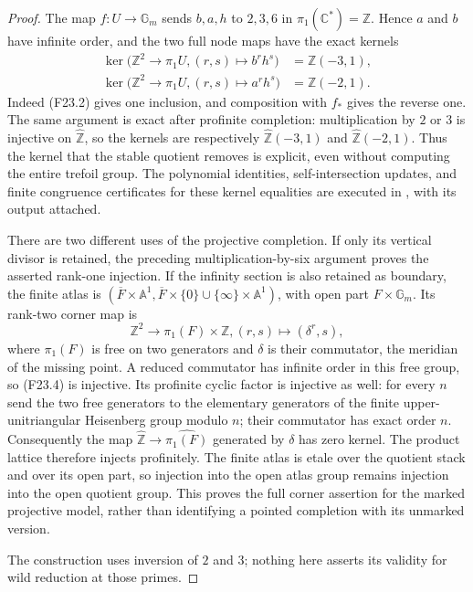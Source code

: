 \begin{proof}
The map $f:U\to\mathbb G_m$ sends $b,a,h$ to $2,3,6$ in
$\pi_1(\mathbb C^*)=\mathbb Z$. Hence $a$ and $b$ have infinite
order, and the two full node maps have the exact kernels
\[
 \begin{split}
 \ker\bigl(\mathbb Z^2\longrightarrow\pi_1U,
                      (r,s)\longmapsto b^r h^s\bigr)
       &=\mathbb Z(-3,1),\\
 \ker\bigl(\mathbb Z^2\longrightarrow\pi_1U,
                      (r,s)\longmapsto a^r h^s\bigr)
       &=\mathbb Z(-2,1).
 \end{split}                                             \tag{F23.3}
\]
Indeed (F23.2) gives one inclusion, and composition with $f_*$
gives the reverse one. The same argument is exact after profinite
completion: multiplication by $2$ or $3$ is injective on
$\widehat{\mathbb Z}$, so the kernels are respectively
$\widehat{\mathbb Z}(-3,1)$ and
$\widehat{\mathbb Z}(-2,1)$. Thus the kernel that the stable
quotient removes is explicit, even without computing the entire
trefoil group. The polynomial identities, self-intersection updates,
and finite congruence certificates for these kernel equalities are
executed in , with its output
attached.

There are two different uses of the projective completion.
If only its vertical divisor is retained, the preceding
multiplication-by-six argument proves the asserted rank-one
injection. If the infinity section is also retained as boundary,
the finite atlas is
$(\overline F\times\mathbb A^1,
  \overline F\times\{0\}\cup\{\infty\}\times\mathbb A^1)$,
with open part $F\times\mathbb G_m$. Its rank-two corner map is
\[
 \mathbb Z^2\longrightarrow \pi_1(F)\times\mathbb Z,
                  (r,s)\longmapsto (\delta^r,s),           \tag{F23.4}
\]
where $\pi_1(F)$ is free on two generators and $\delta$ is their
commutator, the meridian of the missing point. A reduced commutator
has infinite order in this free group, so (F23.4) is injective.
Its profinite cyclic factor is injective as well: for every $n$
send the two free generators to the elementary generators of the
finite upper-unitriangular Heisenberg group modulo $n$; their
commutator has exact order $n$. Consequently the map
$\widehat{\mathbb Z}\to\widehat{\pi_1(F)}$ generated by $\delta$
has zero kernel. The product lattice therefore injects profinitely.
The finite atlas is etale over the quotient stack and over its open
part, so injection into the open atlas group remains injection into
the open quotient group. This proves the full corner assertion for
the marked projective model, rather than identifying a pointed
completion with its unmarked version.


The construction uses inversion of $2$ and $3$; nothing here asserts
its validity for wild reduction at those primes.
\end{proof}

